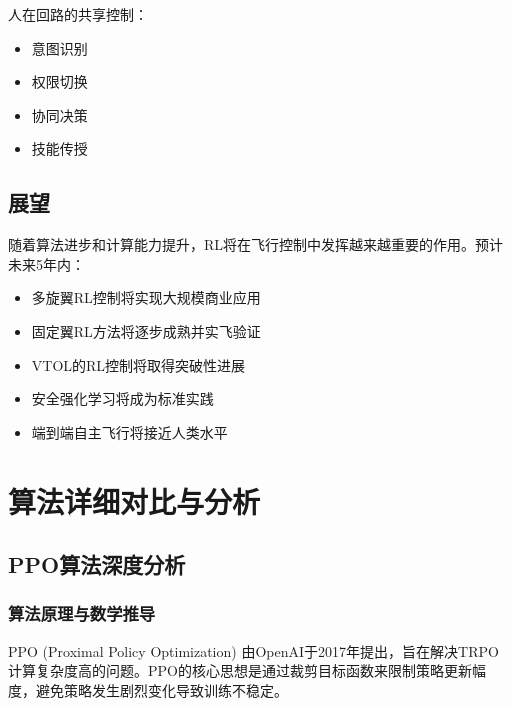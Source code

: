 \documentclass[12pt,a4paper]{ctexart}
\begin{document}
人在回路的共享控制：
\begin{itemize}
    \item 意图识别
    \item 权限切换
    \item 协同决策
    \item 技能传授
\end{itemize}

\subsection{展望}

随着算法进步和计算能力提升，RL将在飞行控制中发挥越来越重要的作用。预计未来5年内：

\begin{itemize}
    \item 多旋翼RL控制将实现大规模商业应用
    \item 固定翼RL方法将逐步成熟并实飞验证
    \item VTOL的RL控制将取得突破性进展
    \item 安全强化学习将成为标准实践
    \item 端到端自主飞行将接近人类水平
\end{itemize}

\section{算法详细对比与分析}\label{sec:algorithm_analysis}

\subsection{PPO算法深度分析}

\subsubsection{算法原理与数学推导}

PPO (Proximal Policy Optimization) 由OpenAI于2017年提出，旨在解决TRPO计算复杂度高的问题。PPO的核心思想是通过裁剪目标函数来限制策略更新幅度，避免策略发生剧烈变化导致训练不稳定。
\end{document}
